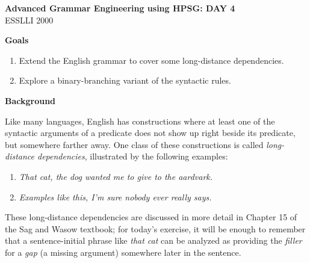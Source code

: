 \documentclass[10pt]{article}
\begin{document}
\begin{center}
\textbf{Advanced Grammar Engineering using HPSG: DAY 4}\\
ESSLLI 2000
\end{center}

\medskip
\textbf{Goals}
\begin{enumerate}
  \item Extend the English grammar to cover some long-distance dependencies.
  \item Explore a binary-branching variant of the syntactic rules.
\end{enumerate}

\medskip
\textbf{Background}

Like many languages, English has constructions where at least one of the
syntactic arguments of a predicate does not show up right beside its
predicate, but somewhere farther away.  One class of these constructions
is called {\it long-distance dependencies}, illustrated by the following
examples:
\begin{enumerate}
  \item {\it That cat, the dog wanted me to give to the aardvark.}
  \item {\it Examples like this, I'm sure nobody ever really says.}
\end{enumerate}
These long-distance dependencies are discussed in more detail in Chapter
15 of the Sag and Wasow textbook; for today's exercise, it will be enough
to remember that a sentence-initial phrase like {\it that cat} can be
analyzed as providing the {\it filler} for a {\it gap} (a missing argument)
somewhere later in the sentence.
\end{document}
